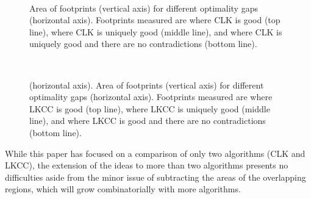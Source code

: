 \documentclass[conference]{IEEEtran}
\begin{document}
\begin{figure}[t]
\centering ~~~~
\caption{Area of footprints (vertical axis) for different optimality gaps (horizontal axis). Footprints measured are where CLK is good (top line), where CLK is uniquely good (middle line), and where CLK is uniquely good and there are no contradictions (bottom line).}
\label{AreasCLK}
\end{figure}

\begin{figure}[!t]
\centering ~~~~
\caption{(horizontal axis). Area of footprints (vertical axis) for different optimality gaps (horizontal axis).  Footprints measured are where LKCC is good (top line), where LKCC is uniquely good (middle line), and where LKCC is good and there are no contradictions (bottom line).}
\label{AreasLKCC}
\end{figure}


While this paper has focused on a comparison of only two algorithms (CLK and LKCC), the extension of the ideas to more than two algorithms presents no difficulties aside from the minor issue of subtracting the areas of the overlapping regions, which will grow combinatorially with more algorithms.
\end{document}
